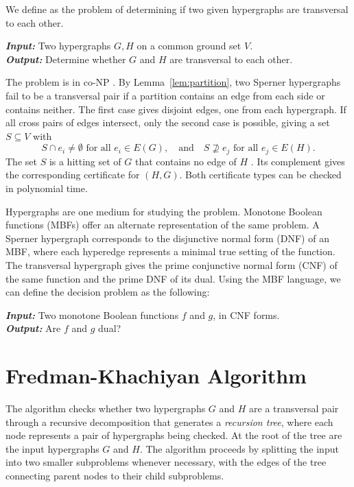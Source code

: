 We define \TransHyp{} as the problem of determining if two given hypergraphs are transversal to each other.

\begin{problem}
\textbf{\textit{Input:}} Two hypergraphs $G,H$ on a common ground set $V$.\\
\textbf{\textit{Output:}} Determine whether $G$ and $H$ are transversal to each other.
\end{problem}

The problem is in co-NP \cite{FK96}. By Lemma~\ref{lem:partition}, two Sperner hypergraphs fail to be a transversal pair if a partition contains an edge from each side or contains neither. The first case gives disjoint edges, one from each hypergraph. If all cross pairs of edges intersect, only the second case is possible, giving a set $S\subseteq V$ with
\begin{equation}\label{eq:witness}
S\cap e_i\neq\emptyset\text{ for all }e_i\in E(G),\quad\text{and}\quad S\nsupseteq e_j\text{ for all }e_j\in E(H).
\end{equation}
The set $S$ is a hitting set of $G$ that contains no edge of $H$ \cite{Rau11}. Its complement gives the corresponding certificate for $(H,G)$. Both certificate types can be checked in polynomial time.

Hypergraphs are one medium for studying the \TransHyp{} problem. Monotone Boolean functions (MBFs) offer an alternate representation of the same problem. A Sperner hypergraph corresponds to the disjunctive normal form (DNF) of an MBF, where each hyperedge represents a minimal true setting of the function. The transversal hypergraph gives the prime conjunctive normal form (CNF) of the same function and the prime DNF of its dual. Using the MBF language, we can define the decision problem as the following:

\begin{problem}
\textbf{\textit{Input:}} Two monotone Boolean functions $f$ and $g$, in CNF forms.\\
\textbf{\textit{Output:}} Are $f$ and $g$ dual?
\end{problem}

\section{Fredman-Khachiyan Algorithm \FKA}

The \FKA{} algorithm checks whether two hypergraphs $G$ and $H$ are a transversal pair through a recursive decomposition that generates a \emph{recursion tree}, where each node represents a pair of hypergraphs being checked. At the root of the tree are the input hypergraphs $G$ and $H$. The algorithm proceeds by splitting the input into two smaller subproblems whenever necessary, with the edges of the tree connecting parent nodes to their child subproblems.

